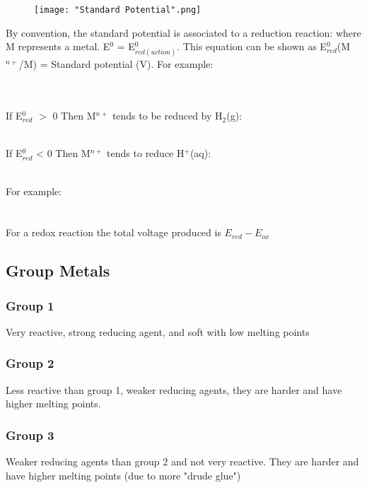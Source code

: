 \documentclass[a4paper, 12pt]{article}
\begin{document}
			\begin{figure}[!h]
				\texttt{[image: "Standard Potential".png]}
			\end{figure}
			\pagebreak
			By convention, the standard potential is associated to a reduction reaction:  where M represents a metal. E$^0$ = E$^0_{red(uction)}$. This equation can be shown as E$^0_{red}$(M$^{n+}$/M) = Standard potential (V). For example: \\
			 \\
			 \\
			\par
			If E$^0_{red}$ $>$ 0 Then M$^{n+}$ tends to be reduced by H$_2$(g): \\
			 \\
			\par
			If E$^0_{red}$ < 0 Then M$^{n+}$ tends to reduce H$^+$(aq): \\
			 \\
			\par
			For example: \\
			 \\
			 \\
			
			For a redox reaction the total voltage produced is $E_{red} - E_{ox}$
			
		\subsection{Group Metals}
			\subsubsection*{Group 1}
				Very reactive, strong reducing agent, and soft with low melting points
			\subsubsection*{Group 2}
				Less reactive than group 1, weaker reducing agents, they are harder and have higher melting points. 
			\subsubsection*{Group 3}
				Weaker reducing agents than group 2 and not very reactive. They are harder and have higher melting points (due to more "drude glue")
			
\end{document}
